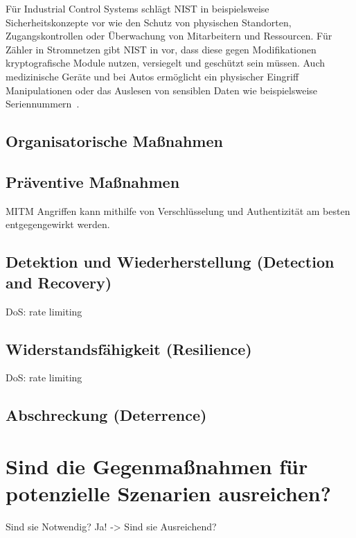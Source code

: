 \documentclass[final,bibliography=totocnumbered]{include/sikseminar}
\begin{document}
Für Industrial Control Systems schlägt NIST in \cite{HUM 153} beispielsweise Sicherheitskonzepte vor wie den Schutz von physischen Standorten, Zugangskontrollen oder Überwachung von Mitarbeitern und Ressourcen.
Für Zähler in Stromnetzen gibt NIST in \cite{HUM 127} vor, dass diese gegen Modifikationen kryptografische Module nutzen, versiegelt und geschützt sein müssen.
Auch medizinische Geräte und bei Autos ermöglicht ein physischer Eingriff Manipulationen oder das Auslesen von sensiblen Daten wie beispielsweise Seriennummern~\cite{HLL+17}.


\subsection{Organisatorische Maßnahmen}\label{subsec:orga}

\subsection{Präventive Maßnahmen}\label{subsec:präventiv}

MITM Angriffen kann mithilfe von Verschlüsselung und Authentizität am besten entgegengewirkt werden.

\subsection{Detektion und Wiederherstellung (Detection and Recovery)}\label{subsec:detektion}
DoS: rate limiting

\subsection{Widerstandsfähigkeit (Resilience)}\label{subsec:widerstand} %

DoS: rate limiting

\subsection{Abschreckung (Deterrence)}\label{subsec:abschreckung} %




\section{Sind die Gegenmaßnahmen für potenzielle Szenarien ausreichen?}\label{sec:diskussion}

Sind sie Notwendig?
Ja! -> Sind sie Ausreichend?


\newpage

\printbibliography
\newpage
\end{document}
